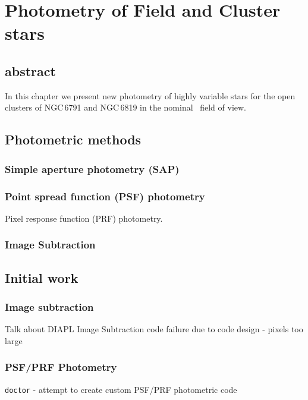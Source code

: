 \chapter{\Kepler Photometry of Field and Cluster stars}
\label{chap:field}

\section*{abstract}
    In this chapter we present new photometry of highly variable stars for the open clusters of NGC\,6791 and NGC\,6819 in the nominal \Kepler~field of view.
\newpage

\section{Photometric methods}


\subsection{Simple aperture photometry (SAP)}

\subsection{Point spread function (PSF) photometry}
Pixel response function (PRF) photometry.

\subsection{Image Subtraction}

\section{Initial work}
\subsection{Image subtraction}
Talk about DIAPL Image Subtraction code failure due to code design - pixels too large

\subsection{PSF/PRF Photometry}
\texttt{doctor} - attempt to create custom PSF/PRF photometric code

